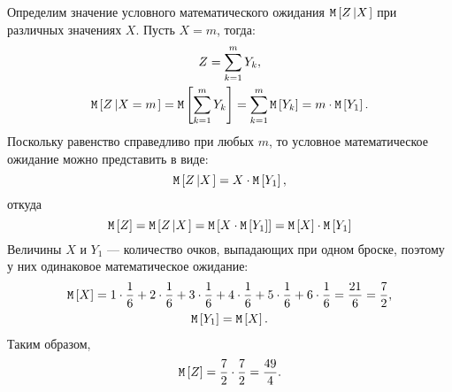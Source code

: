 Определим значение условного математического ожидания $\mathtt{M} \left [ Z \left | X \right . \right ]$ при различных значениях $X$. Пусть $X = m$, тогда:
\begin{gather}
    Z = \sum_{k=1}^m Y_k, \\
    \mathtt{M} \left [ Z \left | X=m \right . \right ]
    = \mathtt{M} \left [ \sum_{k=1}^m Y_k \right ]
    = \sum_{k=1}^m \mathtt{M} \left [ Y_k \right ]
    = m \cdot \mathtt{M} \left [ Y_1 \right ] .
\end{gather}
Поскольку равенство справедливо при любых $m$, то условное математическое ожидание можно представить в виде:
\begin{equation}
    \label{10:463:conditional_expectation}
    \mathtt{M} \left [ Z \left | X \right . \right ] = X \cdot \mathtt{M} \left [ Y_1 \right ] ,
\end{equation}
откуда
\begin{equation}
    \mathtt{M} \left [ Z \right ]
    = \mathtt{M} \left [ Z \left | X \right . \right ]
    = \mathtt{M} \left [ X \cdot \mathtt{M} \left [ Y_1 \right ] \right ]
    = \mathtt{M} \left [ X \right ] \cdot \mathtt{M} \left [ Y_1 \right ]
\end{equation}
Величины $X$ и $Y_1$ --- количество очков, выпадающих при одном броске, поэтому у них одинаковое математическое ожидание:
\begin{gather}
    \mathtt{M} \left [ X \right ]
    = 1 \cdot \frac{1}{6} + 2 \cdot \frac{1}{6} + 3 \cdot \frac{1}{6} + 4 \cdot \frac{1}{6} + 5 \cdot \frac{1}{6} + 6 \cdot \frac{1}{6}
    = \frac{21}{6}
    = \frac{7}{2}, \\
    \mathtt{M} \left [ Y_1 \right ] = \mathtt{M} \left [ X \right ].
\end{gather}
Таким образом,
\begin{equation}
    \mathtt{M} \left [ Z \right ]
    = \frac{7}{2} \cdot \frac{7}{2}
    = \frac{49}{4} .
\end{equation}

